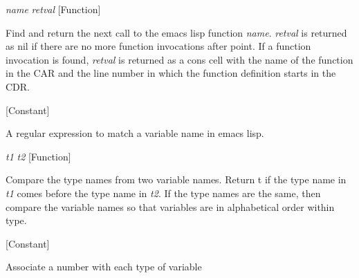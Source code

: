 \vspace{1em}
\noindent
{}
\usebox{\funcname}\emph{name} \emph{retval}
 \hfill [Function]

\begin{doc-string}
Find and return the next call to the emacs lisp function \emph{name}.  \emph{retval} is returned
as nil if there are no more function invocations after point.  If a function
invocation is found, \emph{retval} is returned as a cons cell with the name of the function
in the CAR and the line number in which the function definition starts in the CDR.
\end{doc-string}

\vspace{1em}
\noindent
{}
\usebox{\funcname}
 \hfill [Constant]

\begin{doc-string}
A regular expression to match a variable name in emacs lisp.
\end{doc-string}

\vspace{1em}
\noindent
{}
\usebox{\funcname}\emph{t1} \emph{t2}
 \hfill [Function]

\begin{doc-string}
Compare the type names from two variable names.  Return t if the type
name in \emph{t1} comes before the type name in \emph{t2}.  If the type names are the same,
then compare the variable names so that variables are in alphabetical order
within type.
\end{doc-string}

\vspace{1em}
\noindent
{}
\usebox{\funcname}
 \hfill [Constant]

\begin{doc-string}
Associate a number with each type of variable
\end{doc-string}
